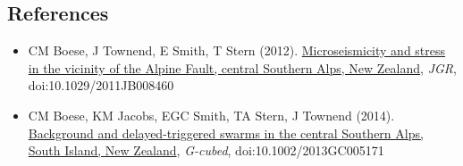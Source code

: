 \documentclass[a4paper,10pt,english]{sphinxmanual}
\begin{document}
\subsection{References}
\label{tutorial:references}\begin{itemize}
\item {} 
CM Boese, J Townend, E Smith, T Stern (2012). \href{http://onlinelibrary.wiley.com/doi/10.1029/2011JB008460/full}{Microseismicity and stress in the vicinity of the Alpine Fault, central Southern Alps, New Zealand}, \emph{JGR}, doi:10.1029/2011JB008460

\item {} 
CM Boese, KM Jacobs, EGC Smith, TA Stern, J Townend (2014). \href{http://onlinelibrary.wiley.com/doi/10.1002/2013GC005171/full}{Background and delayed-triggered swarms in the central Southern Alps, South Island, New Zealand}, \emph{G-cubed}, doi:10.1002/2013GC005171

\end{itemize}
\end{document}
